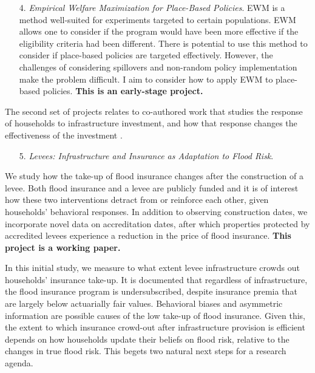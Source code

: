 \begin{enumerate}
\item[4.] \textit{Empirical Welfare Maximization for Place-Based Policies}. EWM \citep{kitagawa_who_2018} is a method well-suited for experiments targeted to certain populations. EWM allows one to consider if the program would have been more effective if the eligibility criteria had been different. There is potential to use this method to consider if place-based policies are targeted effectively. However, the challenges of considering spillovers and non-random policy implementation make the problem difficult. I aim to consider how to apply EWM to place-based policies. \textbf{This is an early-stage project.}
\end{enumerate}

The second set of projects relates to co-authored work that studies the response of households to infrastructure investment, and how that response changes the effectiveness of the investment \citep{vinnakota_levees_2023}. 


\begin{enumerate}
\item[5.] \textit{Levees: Infrastructure and Insurance as Adaptation to Flood Risk}.
\end{enumerate}

We study how the take-up of flood insurance changes after the construction of a levee. Both flood insurance and a levee are publicly funded and it is of interest how these two interventions detract from or reinforce each other, given households’ behavioral responses. In addition to observing construction dates, we incorporate novel data on accreditation dates, after which properties protected by accredited levees experience a reduction in the price of flood insurance. \textbf{This project is a working paper.}

In this initial study, we measure to what extent levee infrastructure crowds out households’ insurance take-up. It is documented that regardless of infrastructure, the flood insurance program is undersubscribed, despite insurance premia that are largely below actuarially fair values. Behavioral biases and asymmetric information are possible causes of the low take-up of flood insurance. Given this, the extent to which insurance crowd-out after infrastructure provision is efficient depends on how households update their beliefs on flood risk, relative to the changes in true flood risk. This begets two natural next steps for a research agenda.

